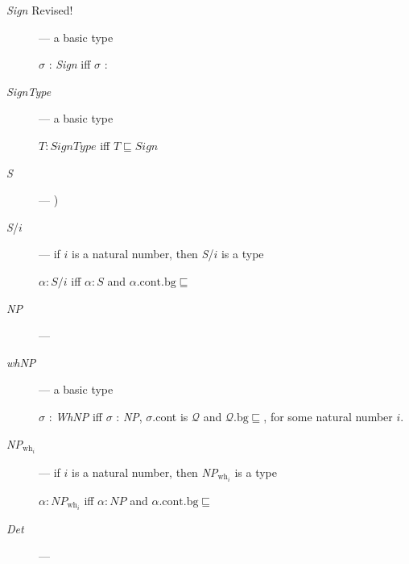 \begin{description}
  
    \item[\textnormal{\textit{Sign}} Revised!] ---  a basic type

      $\sigma$ : \textit{Sign} iff $\sigma$ :

  
\item[\textnormal{\textit{SignType}}] --- a basic type

  $T:\textit{SignType}$ iff $T\sqsubseteq\textit{Sign}$ 

  
\item[\textnormal{\textit{S}}] --- 
  )
  
\item[\textnormal{\textit{S}/$i$}] --- if $i$ is a natural
  number, then \textit{S}/$i$ is a type

  $\alpha:\textit{S}/i$ iff $\alpha:\textit{S}$ and $\alpha.\text{cont}.\text{bg}\sqsubseteq$ 
  
  
\item[\textnormal{\textit{NP}}] --- 
  
\item[\textnormal{\textit{whNP}}] --- a basic type

  $\sigma$ : \textit{WhNP} iff $\sigma$ : \textit{NP}, $\sigma$.cont is $\mathcal{Q}$ and
$\mathcal{Q}.\text{bg}\sqsubseteq$, for some natural number
$i$.

\item[\textnormal{\textit{NP}$_{\text{wh}_i}$}] --- if $i$ is a
  natural number, then \textit{NP}$_{\text{wh}_i}$ is a type

  $\alpha:\textit{NP}_{\text{wh}_i}$ iff $\alpha:\textit{NP}$ and
  $\alpha.\text{cont}.\text{bg}\sqsubseteq$

  
\item[\textnormal{\textit{Det}}] --- 
  

\end{description}
